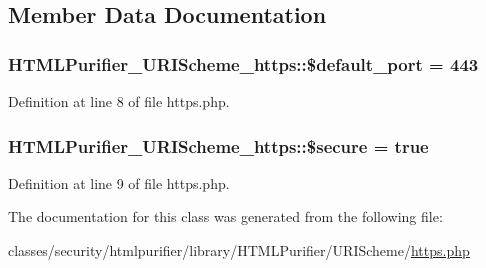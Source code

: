 \subsection{Member Data Documentation}
\hypertarget{classHTMLPurifier__URIScheme__https_a6e15c5f519ce4fb44ead473555741f90}{
\subsubsection[{\$default\+\_\+port}]{\setlength{\rightskip}{0pt plus 5cm}H\+T\+M\+L\+Purifier\+\_\+\+U\+R\+I\+Scheme\+\_\+https\+::\$default\+\_\+port = 443}}\label{classHTMLPurifier__URIScheme__https_a6e15c5f519ce4fb44ead473555741f90}


Definition at line 8 of file https.\+php.

\hypertarget{classHTMLPurifier__URIScheme__https_a4d28074cb176b324d57c89a194f133ea}{
\subsubsection[{\$secure}]{\setlength{\rightskip}{0pt plus 5cm}H\+T\+M\+L\+Purifier\+\_\+\+U\+R\+I\+Scheme\+\_\+https\+::\$secure = true}}\label{classHTMLPurifier__URIScheme__https_a4d28074cb176b324d57c89a194f133ea}


Definition at line 9 of file https.\+php.



The documentation for this class was generated from the following file\+:\begin{DoxyCompactItemize}
\item 
classes/security/htmlpurifier/library/\+H\+T\+M\+L\+Purifier/\+U\+R\+I\+Scheme/\hyperlink{https_8php}{https.\+php}\end{DoxyCompactItemize}
